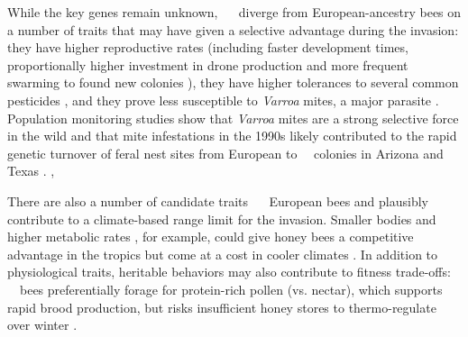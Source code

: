 While the key genes remain unknown, \africanized\ \hyb\  diverge from European-ancestry bees on a number of traits that may have given  a selective advantage during the invasion: they have higher reproductive rates (including faster development times, proportionally higher investment in drone production and more frequent swarming to found new colonies \cite{WINSTON:1992vm}), they have higher tolerances to several common pesticides \cite{Danka:1986ex}, and they prove less susceptible to \textit{Varroa} mites, a major parasite \cite{GuzmanNovoa:1999bu, Vandame:2002kx, Guerra:2000eh, Moretto:1999jx, MedinaFlores:2014fh}. Population monitoring studies show that \textit{Varroa} mites are a strong selective force in the wild and that mite infestations in the 1990s likely contributed to the rapid genetic turnover of feral nest sites from European to \africanized\ \hyb\ colonies in Arizona and Texas \cite{Loper:1999vi, Pinto:2005ep, Bozek:2018br}. , 

There are also a number of candidate traits  \africanized\ \hyb\  European bees and plausibly contribute to a climate-based range limit for the invasion. Smaller bodies \cite{Daly:1978hu} and higher metabolic rates \cite{Southwick:1990cq}, for example, could give honey bees  a competitive advantage in the tropics but come at a cost in cooler climates  \cite{Harrison:2006gk}. In addition to physiological traits, heritable behaviors may also contribute to fitness trade-offs: \africanized\ \hyb\ bees  preferentially forage for protein-rich pollen (vs. nectar), which supports rapid brood production, but risks insufficient honey stores to thermo-regulate over winter \cite{Danka:1987bk, Fewell:2002ct, Harrison:2006gk}.


